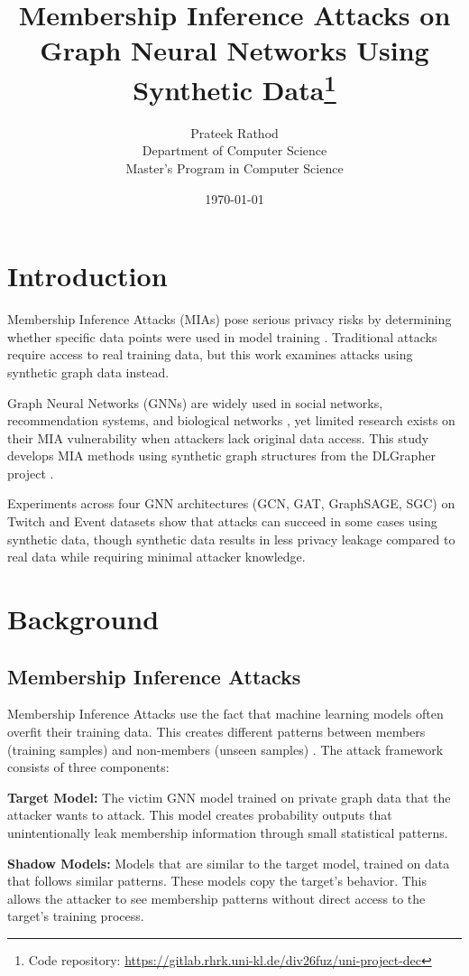 \documentclass{article}
\title{Membership Inference Attacks on Graph Neural Networks Using Synthetic Data\footnote{Code repository: \url{https://gitlab.rhrk.uni-kl.de/div26fuz/uni-project-dec}}}
\author{Prateek Rathod\\
Department of Computer Science\\
Master's Program in Computer Science}
\date{\today}
\begin{document}
\maketitle

\section{Introduction}
Membership Inference Attacks (MIAs) pose serious privacy risks by determining whether specific data points were used in model training \cite{shokri2017membership}. Traditional attacks require access to real training data, but this work examines attacks using synthetic graph data instead.

Graph Neural Networks (GNNs) are widely used in social networks, recommendation systems, and biological networks \cite{kipf2017semi, velickovic2018graph, hamilton2017inductive}, yet limited research exists on their MIA vulnerability \cite{olatunji2021membershipinferenceattackgraph} when attackers lack original data access. This study develops MIA methods using synthetic graph structures from the DLGrapher project \cite{lan2024dlgrapher}.

Experiments across four GNN architectures (GCN, GAT, GraphSAGE, SGC) on Twitch and Event datasets show that attacks can succeed in some cases using synthetic data, though synthetic data results in less privacy leakage compared to real data while requiring minimal attacker knowledge.

\section{Background}
\subsection{Membership Inference Attacks}
Membership Inference Attacks use the fact that machine learning models often overfit their training data. This creates different patterns between members (training samples) and non-members (unseen samples) \cite{salem2019ml, nasr2019comprehensive}. The attack framework consists of three components:

\textbf{Target Model:} The victim GNN model trained on private graph data that the attacker wants to attack. This model creates probability outputs that unintentionally leak membership information through small statistical patterns.

\textbf{Shadow Models:} Models that are similar to the target model, trained on data that follows similar patterns. These models copy the target's behavior. This allows the attacker to see membership patterns without direct access to the target's training process.
\end{document}
